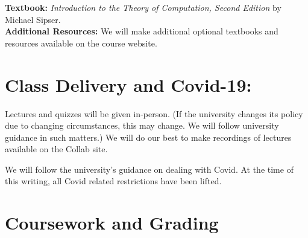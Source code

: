\documentclass[12pt]{article}
\begin{document}
\textbf{Textbook:} \textit{Introduction to the Theory of Computation, Second Edition} by Michael Sipser.\\


\textbf{Additional Resources:} We will make additional optional textbooks and resources available on the course website.

\section*{Class Delivery and Covid-19:}

Lectures and quizzes will be given in-person.  (If the university changes its policy due to changing circumstances, this may change. We will follow university guidance in such matters.) We will do our best to make recordings of lectures available on the Collab site.

We will follow the university's guidance on dealing with Covid. At the time of this writing, all Covid related restrictions have been lifted.



\section*{Coursework and Grading}
\end{document}
